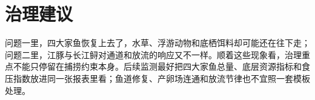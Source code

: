 \section{治理建议}
问题一里，四大家鱼恢复上去了，水草、浮游动物和底栖饵料却可能还在往下走；问题二里，江豚与长江鲟对通道和放流的响应又不一样。顺着这些现象看，治理重点不能只停留在捕捞约束本身。后续监测最好把四大家鱼总量、底层资源指标和食压指数放进同一张报表里看；鱼道修复、产卵场连通和放流节律也不宜照一套模板处理。
